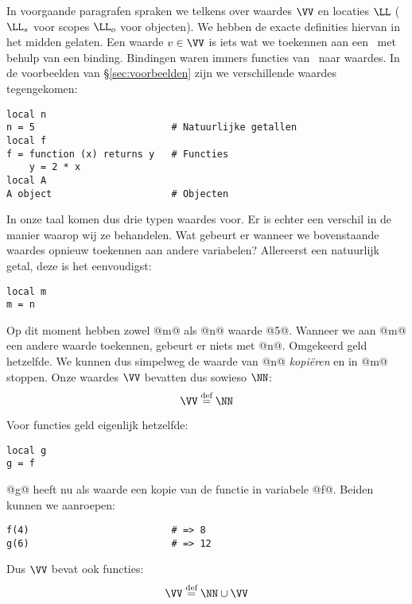 In voorgaande paragrafen spraken we telkens over waardes $\VV$ en locaties $\LL$ ($\LL_s$ voor scopes $\LL_o$ voor objecten). We hebben de exacte definities hiervan in het midden gelaten. Een waarde $v\in\VV$ is iets wat we toekennen aan een \Id\ met behulp van een binding. Bindingen waren immers functies van \Id\ naar waardes. In de voorbeelden van §\ref{sec:voorbeelden} zijn we verschillende waardes tegengekomen:
\begin{lstlisting}
local n
n = 5                        # Natuurlijke getallen
local f
f = function (x) returns y   # Functies
    y = 2 * x
local A
A object                     # Objecten
\end{lstlisting}
In onze taal komen dus drie typen waardes voor. Er is echter een verschil in de manier waarop wij ze behandelen. Wat gebeurt er wanneer we bovenstaande waardes opnieuw toekennen aan andere variabelen? Allereerst een natuurlijk getal, deze is het eenvoudigst:
\begin{lstlisting}
local m
m = n
\end{lstlisting}
Op dit moment hebben zowel @m@ als @n@ waarde @5@. Wanneer we aan @m@ een andere waarde toekennen, gebeurt er niets met @n@. Omgekeerd geld hetzelfde. We kunnen dus simpelweg de waarde van @n@ \emph{kopiëren} en in @m@ stoppen. Onze waardes $\VV$ bevatten dus sowieso $\NN$:
\begin{equation*}
  \VV \DEF \NN
\end{equation*}

Voor functies geld eigenlijk hetzelfde:
\begin{lstlisting}
local g
g = f
\end{lstlisting}
@g@ heeft nu als waarde een kopie van de functie in variabele @f@. Beiden kunnen we aanroepen:
\begin{lstlisting}
f(4)                         # => 8
g(6)                         # => 12
\end{lstlisting}
Dus $\VV$ bevat ook functies:
\begin{equation*}
  \VV \DEF \NN \cup \VV
\end{equation*}

